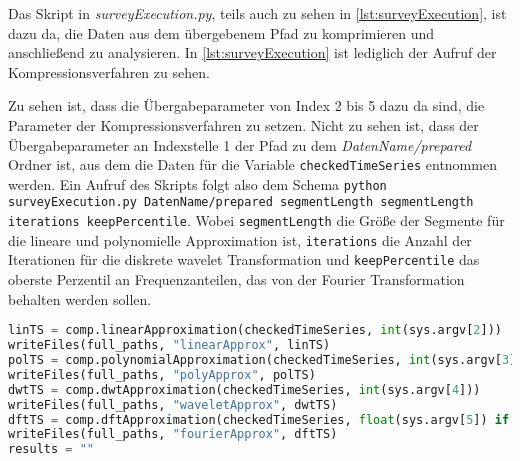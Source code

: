 Das Skript in \textit{surveyExecution.py}, teils auch zu sehen in \autoref{lst:surveyExecution}, ist dazu da, die Daten aus dem übergebenem Pfad zu komprimieren und anschließend zu analysieren. In \autoref{lst:surveyExecution} ist lediglich der Aufruf der Kompressionsverfahren zu sehen. 

Zu sehen ist, dass die Übergabeparameter von Index 2 bis 5 dazu da sind, die Parameter der Kompressionsverfahren zu setzen. Nicht zu sehen ist, dass der Übergabeparameter an Indexstelle 1 der Pfad zu dem \textit{DatenName/prepared} Ordner ist, aus dem die Daten für die Variable \lstinline|checkedTimeSeries| entnommen werden. Ein Aufruf des Skripts folgt also dem Schema \lstinline|python surveyExecution.py DatenName/prepared segmentLength segmentLength iterations keepPercentile|. Wobei \lstinline|segmentLength| die Größe der Segmente für die lineare und polynomielle Approximation ist, \lstinline|iterations| die Anzahl der Iterationen für die diskrete wavelet Transformation und \lstinline|keepPercentile| das oberste Perzentil an Frequenzanteilen, das von der Fourier Transformation behalten werden sollen.
\begin{lstlisting}[caption=Funktion zur Zeitmessung, language=Python, label=lst:surveyExecution, style=Python]
linTS = comp.linearApproximation(checkedTimeSeries, int(sys.argv[2]))
writeFiles(full_paths, "linearApprox", linTS)
polTS = comp.polynomialApproximation(checkedTimeSeries, int(sys.argv[3]))
writeFiles(full_paths, "polyApprox", polTS)
dwtTS = comp.dwtApproximation(checkedTimeSeries, int(sys.argv[4]))
writeFiles(full_paths, "waveletApprox", dwtTS)
dftTS = comp.dftApproximation(checkedTimeSeries, float(sys.argv[5]) if len(sys.argv) == 6 else 10)
writeFiles(full_paths, "fourierApprox", dftTS)
results = ""
\end{lstlisting}